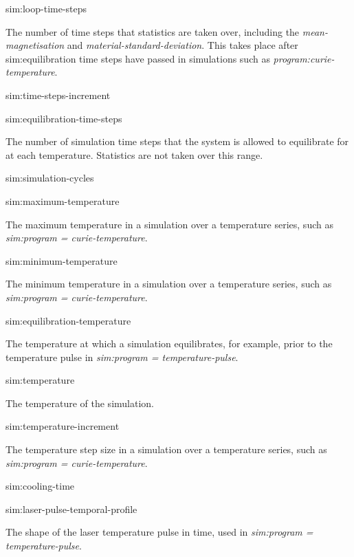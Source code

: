 {\zicf sim:loop-time-steps} The number of time steps that statistics are taken over, including the \textit{mean-magnetisation} and \textit{material-standard-deviation}. This takes place after sim:equilibration time steps have passed in simulations such as \textit{program:curie-temperature}.

{\zicf sim:time-steps-increment}

{\zicf sim:equilibration-time-steps} The number of simulation time steps that the system is allowed to equilibrate for at each temperature. Statistics are not taken over this range.

{\zicf sim:simulation-cycles}

{\zicf sim:maximum-temperature} The maximum temperature in a simulation over a temperature series, such as \textit{sim:program = curie-temperature}.

{\zicf sim:minimum-temperature} The minimum temperature in a simulation over a temperature series, such as \textit{sim:program = curie-temperature}.

{\zicf sim:equilibration-temperature} The temperature at which a simulation equilibrates, for example, prior to the temperature pulse in \textit{sim:program = temperature-pulse}.

{\zicf sim:temperature} The temperature of the simulation.

{\zicf sim:temperature-increment} The temperature step size in a simulation over a temperature series, such as \textit{sim:program = curie-temperature}.

{\zicf sim:cooling-time}

{\zicf sim:laser-pulse-temporal-profile} The shape of the laser temperature pulse in time, used in \textit{sim:program = temperature-pulse}.
  
